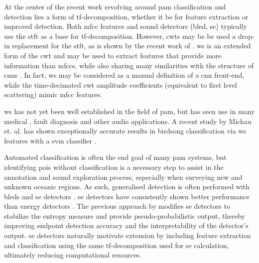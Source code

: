 At the center of the recent work revolving around \ac{pam} classification and detection lies a form of \ac{tf}-decomposition, whether it be for feature extraction or improved detection. Both \ac{mfcc} features and sound detectors (\ac{bled}, \ac{se}) typically use the \ac{stft} as a base for \ac{tf}-decomposition. However, \acp{cwt} may be be used a drop-in replacement for the \ac{stft}, as is shown by the recent work of \citet{mypaper}. \Ac{ws} is an extended form of the \ac{cwt} and may be used to extract features that provide more information than \acp{mfcc}, while also sharing many similarities with the structure of \acp{cnn} \citep{ws}. In fact, \ac{ws} may be considered as a manual definition of a \ac{cnn} front-end, while the time-decimated \ac{cwt} amplitude coefficients (equivalent to first level scattering) mimic \ac{mfcc} features.

\Ac{ws} has not yet been well established in the field of \ac{pam}, but has seen use in many medical \citep{ws_ecg, ecg_ws_svm}, fault diagnosis \citep{ws_fault_diag} and other audio \citep{ws_speech, ws_audio2, ws_audio} applications. A recent study by Michau et. al. has shown exceptionally accurate results in birdsong classification via \ac{ws} features with a \ac{svm} classifier \citep{scattering_birdsong}.

Automated classification is often the end goal of many \ac{pam} systems, but identifying \acp{poi} without classification is a necessary step to assist in the annotation and sound exploration process, especially when surveying new and unknown oceanic regions. As such, generalised detection is often performed with \acp{bled} and \ac{se} detectors \citep{entropyOCEANS}. \Ac{se} detectors have consistently shown better performance than energy detectors \citep{entropyJASA}. The previous approach by \citet{mypaper} modifies \ac{se} detectors to stabilize the entropy measure and provide pseudo-probabilistic output, thereby improving endpoint detection accuracy and the interpretability of the detector's output. \ac{se} detectors naturally motivate extension by including feature extraction and classification using the same \ac{tf}-decomposition used for \ac{se} calculation, ultimately reducing computational resources.

